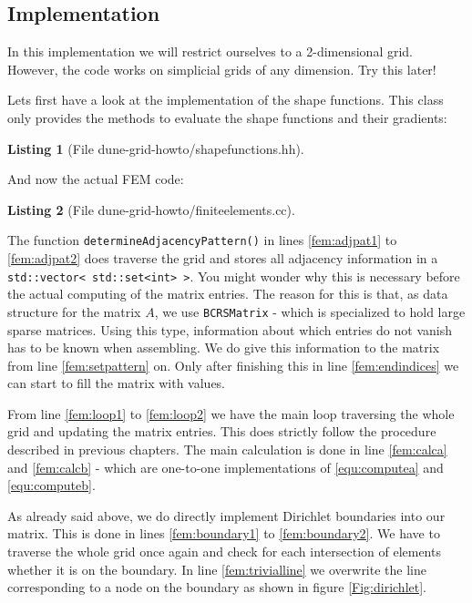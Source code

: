 \documentclass[11pt,a4paper,headinclude,footinclude,DIV16,headings=normal]{scrreprt}
\newtheorem{lst}{Listing}
\begin{document}
\subsection{Implementation}

In this implementation we will restrict ourselves to a 2-dimensional grid. However, the code works on simplicial grids of any dimension. Try this later!

Lets first have a look at the implementation of the shape functions. This class only provides the methods to evaluate the shape functions and their gradients:

\begin{lst}[File dune-grid-howto/shapefunctions.hh] \mbox{}
\nopagebreak

\end{lst}

And now the actual FEM code:

\begin{lst}[File dune-grid-howto/finiteelements.cc] \mbox{}
\nopagebreak

\end{lst}

The function \lstinline!determineAdjacencyPattern()! in lines \ref{fem:adjpat1} to \ref{fem:adjpat2} does traverse the grid and stores all adjacency information in a \lstinline!std::vector< std::set<int> >!. You might wonder why this is necessary before the actual computing of the matrix entries. The reason for this is that, as data structure for the matrix $A$, we use \lstinline!BCRSMatrix! - which is specialized to hold large sparse matrices. Using this type, information about which entries do not vanish has to be known when assembling. We do give this information to the matrix from line \ref{fem:setpattern} on. Only after finishing this in line \ref{fem:endindices} we can start to fill the matrix with values.

From line \ref{fem:loop1} to \ref{fem:loop2} we have the main loop traversing the whole grid and updating the matrix entries. This does strictly follow the procedure described in previous chapters. The main calculation is done in line \ref{fem:calca} and \ref{fem:calcb} - which are one-to-one implementations of \ref{equ:computea} and \ref{equ:computeb}.

As already said above, we do directly implement Dirichlet boundaries into our matrix. This is done in lines \ref{fem:boundary1} to \ref{fem:boundary2}. We have to traverse the whole grid once again and check for each intersection of elements whether it is on the boundary. In line \ref{fem:trivialline} we overwrite the line corresponding to a node on the boundary as shown in figure \ref{Fig:dirichlet}.
\end{document}
